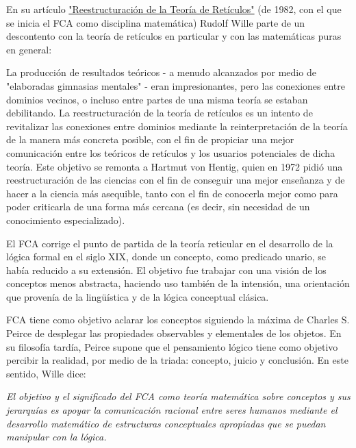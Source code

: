 \documentclass[12pt]{article}
\begin{document}
		En su art\'{i}culo 
		\href{http://books.google.de/books?hl=de&lr=&id=gwpq0acO3kgC&oi=fnd&pg=PA314&dq=Wille+Restructuring+Lattice+Theory&ots=zYmNQeCJKb&sig=TyDygU5lU_91iJWIuJbNi2or6Ls#v=onepage&q=Wille Restructuring Lattice Theory&f=false}{"Reestructuraci\'{o}n de la Teor\'{i}a de Ret\'{i}culos"}
		(de 1982, con el que se inicia el FCA como disciplina matem\'{a}tica) Rudolf Wille parte de un descontento con la 
		teor\'{i}a de ret\'{i}culos en particular y con las matem\'{a}ticas puras en general: 
		
		La producci\'{o}n de resultados te\'{o}ricos - a menudo alcanzados por medio de "elaboradas 
		gimnasias mentales" - eran impresionantes, pero las conexiones entre dominios vecinos, o
		incluso entre partes de una misma teor\'{i}a se estaban debilitando.
		La reestructuraci\'{o}n de la teor\'{i}a de ret\'{i}culos es un intento de revitalizar las 
		conexiones entre dominios mediante la reinterpretaci\'{o}n de la teor\'{i}a de la manera m\'{a}s
		concreta posible, con el fin de propiciar una mejor comunicaci\'{o}n entre los te\'{o}ricos de 
		ret\'{i}culos y los usuarios potenciales de dicha teor\'{i}a. Este objetivo se remonta a Hartmut 
		von Hentig, quien en 1972 pidi\'{o} una reestructuraci\'{o}n de las ciencias con el fin de
		conseguir una mejor enseñanza y de hacer a la ciencia m\'{a}s asequible, tanto con el fin de 
		conocerla mejor como para poder criticarla de una forma m\'{a}s cercana (es decir, sin necesidad
		de un conocimiento especializado).
		
		El FCA corrige el punto de partida de la teor\'{i}a reticular en el desarrollo de la l\'{o}gica formal en 
		el siglo XIX, donde un concepto, como predicado unario, se hab\'{i}a reducido a su extensi\'{o}n. El 
		objetivo fue trabajar con una visi\'{o}n de los conceptos menos abstracta, haciendo uso tambi\'{e}n de la 
		intensi\'{o}n, una orientaci\'{o}n que proven\'{i}a de la lingü\'{i}stica y de la l\'{o}gica conceptual cl\'{a}sica.
		
		FCA tiene como objetivo aclarar los conceptos siguiendo la m\'{a}xima de Charles S. Peirce de desplegar 
		las propiedades observables y elementales de los objetos. En su filosof\'{i}a tard\'{i}a, Peirce supone que el 
		pensamiento l\'{o}gico tiene como objetivo percibir la realidad, por medio de la triada: concepto, 
		juicio y conclusi\'{o}n. En este sentido, Wille dice: 
		
		\textit{El objetivo y el significado del FCA como teor\'{i}a matem\'{a}tica sobre conceptos y sus jerarqu\'{i}as es 
		apoyar la comunicaci\'{o}n racional entre seres humanos mediante el desarrollo matem\'{a}tico de 
		estructuras conceptuales apropiadas que se puedan manipular con la l\'{o}gica.}
		
\end{document}
